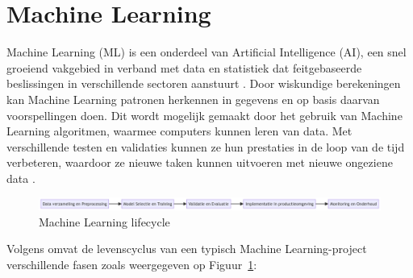 
\section{Machine Learning}

Machine Learning (ML) is een onderdeel van Artificial Intelligence (AI), een snel groeiend vakgebied in verband met data en statistiek dat feitgebaseerde beslissingen in verschillende sectoren aanstuurt \autocite{Jordan2015}. Door wiskundige berekeningen kan Machine Learning patronen herkennen in gegevens en op basis daarvan voorspellingen doen. Dit wordt mogelijk gemaakt door het gebruik van Machine Learning algoritmen, waarmee computers kunnen leren van data. Met verschillende testen en validaties kunnen ze hun prestaties in de loop van de tijd verbeteren, waardoor ze nieuwe taken kunnen uitvoeren met nieuwe ongeziene data \autocite{Shaveta2023}.\newline

\begin{figure}
    \includegraphics[width=\linewidth]{graphics/mlcycle.png}
    \caption{Machine Learning lifecycle}
    \label{fig:ML_cycle}
\end{figure}

Volgens \textcite{Schlegel2022} omvat de levenscyclus van een typisch Machine Learning-project verschillende fasen zoals weergegeven op Figuur~\ref{fig:ML_cycle}:

